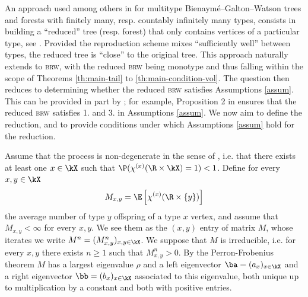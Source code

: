 \documentclass[10pt,a4paper]{article}
\newcommand{\brw}{\textsc{brw}\xspace}
\newcommand{\brws}{\textsc{brw}s\xspace}
\newcommand{\repscheme}{reproduction scheme\xspace}
\begin{document}
An approach used among others in \cite{miermont2008invarianceGW, raphaelis2017scaling} for multitype Bienaymé--Galton--Watson trees and forests with finitely many, resp. countably infinitely many types, consists in building a ``reduced'' tree (resp. forest) that only contains vertices of a particular type, see \cite[Section 1.3]{raphaelis2017scaling}. %
Provided the \repscheme mixes ``sufficiently well'' between types, the reduced tree is ``close'' to the original tree. %
This approach naturally extends to \brw, with the reduced \brw being monotype and thus falling within the scope of Theorems \ref{th:main-tail} to \ref{th:main-condition-vol}. The question then reduces to determining whether the reduced \brw satisfies Assumptions \ref{assum}. This can be provided in part by \cite{miermont2008invarianceGW, raphaelis2017scaling}; for example, Proposition 2 in \cite{raphaelis2017scaling} ensures that the reduced \brw satisfies 1. and 3. in Assumptions \ref{assum}. We now aim to define the reduction, and to provide conditions under which Assumptions \ref{assum} hold for the reduction. 


Assume that the process is non-degenerate in the sense of \cite{miermont2008invarianceGW}, i.e. that there exists at least one $x\in\kX$ such that $\P(\chi^{(x)}(\R\times\kX) = 1)<1$. 
Define for every $x,y\in\kX$
\begin{equation}\label{eq:def-M}
M_{x,y} = \E\left[\chi^{(x)}(\R \times \{y\}) \right]
\end{equation}
the average number of type $y$ offspring of a type $x$ vertex, and assume that $M_{x,y} < \infty$ for every $x,y$. We see them as the $(x,y)$ entry of matrix $M$, whose iterates we write $M^n = (M^n_{x,y})_{x,y\in\kX}$. We suppose that $M$ is irreducible, i.e. for every $x,y$ there exists $n\geq 1$ such that $M^n_{x,y}>0$. By the Perron-Frobenius theorem $M$ has a largest eigenvalue $\rho$ and a left eigenvector $\ba = (a_x)_{x\in\kX}$ and a right eigenvector $\bb = (b_x)_{x\in\kX}$ associated to this eigenvalue, both unique up to multiplication by a constant and both with positive entries. 
\end{document}
